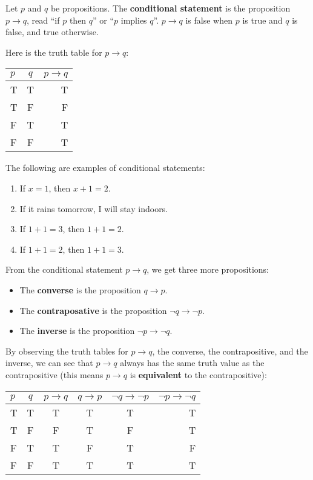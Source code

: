 \documentclass[12t]{scrartcl}
\theoremstyle{plain}
\theoremstyle{definition}
\begin{document}
 Let $p$ and $q$ be propositions. The \textbf{conditional statement} is the proposition $p\rightarrow q$, read ``if $p$ then $q$'' or ``$p$ implies $q$''. $p\rightarrow q$ is false when $p$ is true and $q$ is false, and true otherwise.

Here is the truth table for $p\rightarrow q$:
\begin{tabular}{lc|r}
$p$ & $q$ & $p\rightarrow q$ \\\hline
T & T & T \\
T & F & F \\
F & T & T \\
F & F & T
\end{tabular}

\example The following are examples of conditional statements:
\begin{enumerate}[nosep]
    \item If $x=1$, then $x+1=2$.
    \item If it rains tomorrow, I will stay indoors.
    \item If $1+1=3$, then $1+1=2$.
    \item If $1+1=2$, then $1+1=3$.
\end{enumerate}

\vspace{.25cm}
From the conditional statement $p\rightarrow q$, we get three more propositions:
\begin{itemize}[nosep]
    \item The \textbf{converse} is the proposition $q\rightarrow p$.
    \item The \textbf{contraposative} is the proposition $\neg q\rightarrow\neg p$.
    \item The \textbf{inverse} is the proposition $\neg p\rightarrow \neg q$.
\end{itemize}

By observing the truth tables for $p\rightarrow q$, the converse, the contrapositive, and the inverse, we can see that $p\rightarrow q$ always has the same truth value as the contrapositive (this means $p\rightarrow q$ is \textbf{equivalent} to the contrapositive):\\
\begin{tabular}{lc|c|c|c|r}
$p$ & $q$ & $p\rightarrow q$ & $q\rightarrow p$ & $\neg q\rightarrow\neg p$ & $\neg p\rightarrow\neg q$ \\\hline
T & T & T & T & T & T \\
T & F & F & T & F & T \\
F & T & T & F & T & F \\
F & F & T & T & T & T
\end{tabular}
\end{document}

